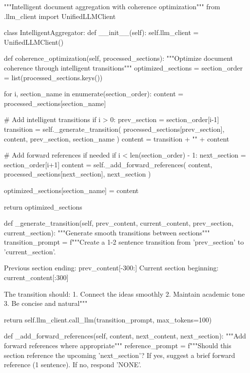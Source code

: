 """Intelligent document aggregation with coherence optimization"""
from .llm_client import UnifiedLLMClient

class IntelligentAggregator:
    def __init__(self):
        self.llm_client = UnifiedLLMClient()
        
    def coherence_optimization(self, processed_sections):
        """Optimize document coherence through intelligent transitions"""
        optimized_sections = {}
        section_order = list(processed_sections.keys())
        
        for i, section_name in enumerate(section_order):
            content = processed_sections[section_name]
            
            # Add intelligent transitions
            if i > 0:
                prev_section = section_order[i-1]
                transition = self._generate_transition(
                    processed_sections[prev_section], 
                    content, 
                    prev_section, 
                    section_name
                )
                content = transition + "\n\n" + content
            
            # Add forward references if needed
            if i < len(section_order) - 1:
                next_section = section_order[i+1]
                content = self._add_forward_references(
                    content, 
                    processed_sections[next_section], 
                    next_section
                )
            
            optimized_sections[section_name] = content
        
        return optimized_sections
    
    def _generate_transition(self, prev_content, current_content, prev_section, current_section):
        """Generate smooth transitions between sections"""
        transition_prompt = f"""Create a 1-2 sentence transition from '{prev_section}' to '{current_section}'.

Previous section ending: {prev_content[-300:]}
Current section beginning: {current_content[:300]}

The transition should:
1. Connect the ideas smoothly
2. Maintain academic tone
3. Be concise and natural"""
        
        return self.llm_client.call_llm(transition_prompt, max_tokens=100)
    
    def _add_forward_references(self, content, next_content, next_section):
        """Add forward references where appropriate"""
        reference_prompt = f"""Should this section reference the upcoming '{next_section}'? 
If yes, suggest a brief forward reference (1 sentence). If no, respond 'NONE'.

